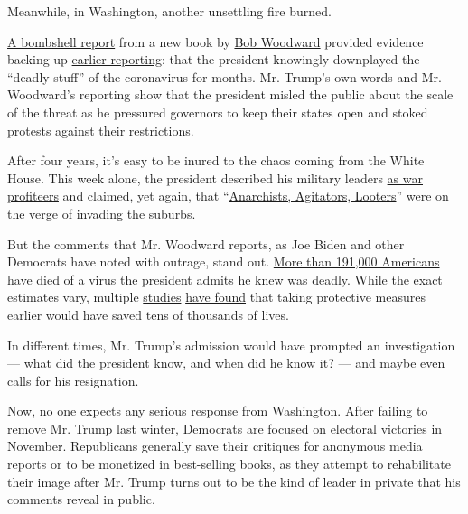 Meanwhile, in Washington, another unsettling fire burned.

\href{https://www.nytimes3xbfgragh.onion/2020/09/09/us/politics/woodward-trump-book-virus.html}{A
bombshell report} from a new book by
\href{https://www.nytimes3xbfgragh.onion/2020/09/10/us/politics/trump-woodward.html}{Bob
Woodward} provided evidence backing up
\href{https://www.nytimes3xbfgragh.onion/2020/04/11/us/politics/coronavirus-trump-response.html}{earlier
reporting}: that the president knowingly downplayed the ``deadly stuff''
of the coronavirus for months. Mr. Trump's own words and Mr. Woodward's
reporting show that the president misled the public about the scale of
the threat as he pressured governors to keep their states open and
stoked protests against their restrictions.

After four years, it's easy to be inured to the chaos coming from the
White House. This week alone, the president described his military
leaders
\href{https://www.nytimes3xbfgragh.onion/2020/09/07/us/politics/wisconsin-biden-harris-trump-pence.html}{as
war profiteers} and claimed, yet again, that
``\href{https://twitter.com/realDonaldTrump/status/1304060630656311296}{Anarchists,
Agitators, Looters}'' were on the verge of invading the suburbs.

But the comments that Mr. Woodward reports, as Joe Biden and other
Democrats have noted with outrage, stand out.
\href{https://www.nytimes3xbfgragh.onion/interactive/2020/us/coronavirus-us-cases.html}{More
than 191,000 Americans} have died of a virus the president admits he
knew was deadly. While the exact estimates vary, multiple
\href{https://www.statnews.com/2020/06/19/faster-response-prevented-most-us-covid-19-deaths/}{studies}
\href{https://www.medrxiv.org/content/10.1101/2020.05.15.20103655v1.full.pdf}{have
found} that taking protective measures earlier would have saved tens of
thousands of lives.

In different times, Mr. Trump's admission would have prompted an
investigation ---
\href{https://www.brennancenter.org/our-work/analysis-opinion/curious-history-what-did-president-know-and-when-did-he-know-it}{what
did the president know, and when did he know it?} --- and maybe even
calls for his resignation.

Now, no one expects any serious response from Washington. After failing
to remove Mr. Trump last winter, Democrats are focused on electoral
victories in November. Republicans generally save their critiques for
anonymous media reports or to be monetized in best-selling books, as
they attempt to rehabilitate their image after Mr. Trump turns out to be
the kind of leader in private that his comments reveal in public.

